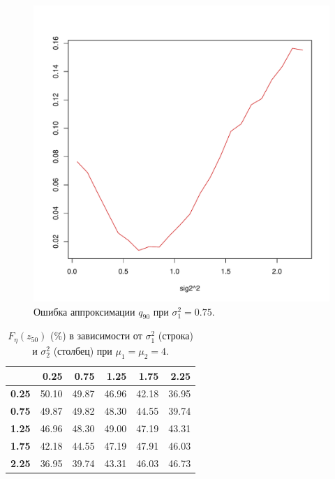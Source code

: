 \documentclass[12pt]{article}
\begin{document}
\begin{figure}[!hhh]
	\begin{center}
		\begin{minipage}[h]{0.8\linewidth}
			\includegraphics[width=1\linewidth]{img/gr_neww_3.pdf}
			\caption{Ошибка аппроксимации $q_{90}$ при $\sigma_{1}^{2} = 0.75$.} %
			\label{ris9} %
		\end{minipage}	
	\end{center}
\end{figure}
	
	
	\begin{table}[!hhh]
		\centering
		\caption{$F_{\eta}(z_{50})$ ($\%$) в зависимости от $\sigma_{1}^{2}$ (строка) и $\sigma_{2}^{2}$ (столбец) при $\mu_{1} = \mu_{2} = 4$. }
		\label{tab4}
		\begin{tabular}{rrrrrr}
			\hline
			& \textbf{0.25} & \textbf{0.75} & \textbf{1.25} & \textbf{1.75} & \textbf{2.25} \\ 
			\hline
			\textbf{0.25} & 50.10 & 49.87 & 46.96 & 42.18 & 36.95 \\ 
			\textbf{0.75} & 49.87 & 49.82 & 48.30 & 44.55 & 39.74 \\ 
			\textbf{1.25} & 46.96 & 48.30 & 49.00 & 47.19 & 43.31 \\ 
			\textbf{1.75} & 42.18 & 44.55 & 47.19 & 47.91 & 46.03 \\ 
			\textbf{2.25} & 36.95 & 39.74 & 43.31 & 46.03 & 46.73 \\ 
			\hline
		\end{tabular}
	\end{table}
\end{document}
